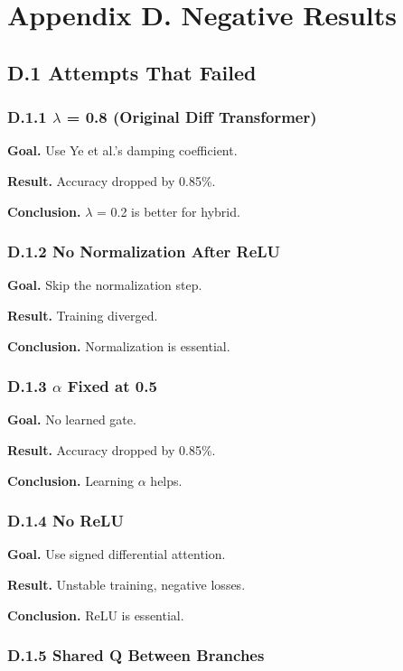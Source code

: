\section{Appendix D. Negative Results}

\subsection{D.1 Attempts That Failed}

\subsubsection{D.1.1 $\lambda$ = 0.8 (Original Diff Transformer)}

\textbf{Goal.} Use Ye et al.'s damping coefficient.

\textbf{Result.} Accuracy dropped by 0.85\%.

\textbf{Conclusion.} $\lambda$ = 0.2 is better for hybrid.

\subsubsection{D.1.2 No Normalization After ReLU}

\textbf{Goal.} Skip the normalization step.

\textbf{Result.} Training diverged.

\textbf{Conclusion.} Normalization is essential.

\subsubsection{D.1.3 $\alpha$ Fixed at 0.5}

\textbf{Goal.} No learned gate.

\textbf{Result.} Accuracy dropped by 0.85\%.

\textbf{Conclusion.} Learning $\alpha$ helps.

\subsubsection{D.1.4 No ReLU}

\textbf{Goal.} Use signed differential attention.

\textbf{Result.} Unstable training, negative losses.

\textbf{Conclusion.} ReLU is essential.

\subsubsection{D.1.5 Shared Q Between Branches}


